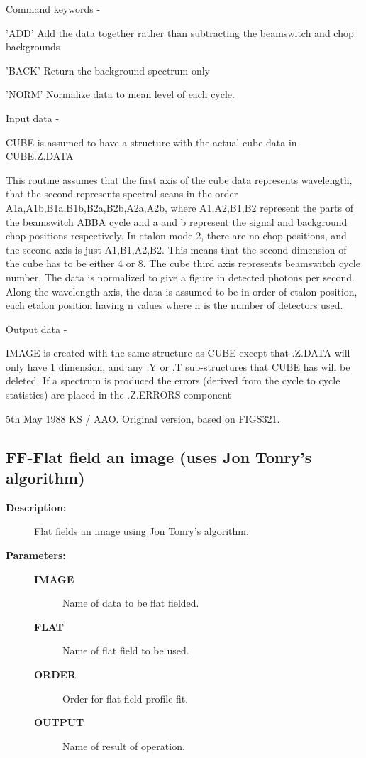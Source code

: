 \begin{description}
\begin{description}
\begin{terminalv}
 Command keywords -

 'ADD'      Add the data together rather than subtracting the
            beamswitch and chop backgrounds

 'BACK'     Return the background spectrum only

 'NORM'     Normalize data to mean level of each cycle.

 Input data -

 CUBE is assumed to have a structure with the actual
 cube data in CUBE.Z.DATA

 This routine assumes that the first axis of the cube data
 represents wavelength, that the second represents spectral
 scans in the order A1a,A1b,B1a,B1b,B2a,B2b,A2a,A2b, where
 A1,A2,B1,B2 represent the parts of the beamswitch ABBA cycle
 and a and b represent the signal and background chop positions
 respectively.  In etalon mode 2, there are no chop positions,
 and the second axis is just A1,B1,A2,B2. This means that the
 second dimension of the cube has to be either 4 or 8.  The
 cube third axis represents beamswitch cycle number.
 The data is normalized to give a figure in detected photons
 per second.  Along the wavelength axis, the data is assumed
 to be in order of etalon position, each etalon position having
 n values where n is the number of detectors used.

 Output data -

 IMAGE is created with the same structure as CUBE
 except that .Z.DATA will only have 1 dimension, and any
 .Y or .T sub-structures that CUBE has will be deleted.
 If a spectrum is produced the errors (derived from
 the cycle to cycle statistics) are placed in the .Z.ERRORS
 component

  5th May 1988  KS / AAO.   Original version, based on FIGS321.
\end{terminalv}
\end{description}
\subsection{FF-\label{FF}Flat field an image (uses Jon Tonry's algorithm)}
\begin{description}

\item [\textbf{Description:}]
 Flat fields an image using Jon Tonry's algorithm.

\item [\textbf{Parameters:}]
\begin{description}
\item [\textbf{IMAGE}]
 Name of data to be flat fielded.
\item [\textbf{FLAT}]
 Name of flat field to be used.
\item [\textbf{ORDER}]
 Order for flat field profile fit.
\item [\textbf{OUTPUT}]
 Name of result of operation.
\end{description}


\end{description}
\end{description}
